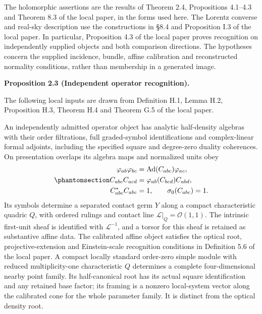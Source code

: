 \documentclass[
  english,
  11pt,
  reqno]{amsart}
\makeatletter
\newcommand{\pandocstatementheading}[1]{%
  \par\addpenalty{\@beginparpenalty}%
  \addvspace{.5\baselineskip plus .2\baselineskip minus .2\baselineskip}%
  {\normalfont\bfseries #1\par}%
  \nobreak\@afterindenttrue\@afterheading
}
\makeatother
\begin{document}
The holomorphic assertions are the results of Theorem 2.4, Propositions
4.1--4.3 and Theorem 8.3 of the local paper, in the forms used here. The
Lorentz converse and real-sky description use the constructions in §8.4
and Proposition I.3 of the local paper. In particular, Proposition 4.3
of the local paper proves recognition on independently supplied objects
and both comparison directions. The hypotheses concern the supplied
incidence, bundle, affine calibration and reconstructed normality
conditions, rather than membership in a generated image.

\pandocstatementheading{\protect{}\label{prop:independent-local-operator-input}Proposition 2.3 (Independent operator recognition).}

The following local inputs are drawn from Definition H.1, Lemma H.2,
Proposition H.3, Theorem H.4 and Theorem G.5 of the local paper.

An independently admitted operator object has analytic half-density
algebras with their order filtrations, full graded-symbol
identifications and complex-linear formal adjoints, including the
specified square and degree-zero duality coherences. On presentation
overlaps its algebra maps and normalized units obey
\begin{equation}\protect\phantomsection\label{eq:local-operator-algebroid-input}{
\begin{aligned}
\varphi_{ab}\varphi_{bc}
&=\operatorname{Ad}(C_{abc})\varphi_{ac},\\
C_{abc}C_{acd}
&=\varphi_{ab}(C_{bcd})C_{abd},\\
C_{abc}^*C_{abc}&=1,
\qquad \sigma_0(C_{abc})=1.
\end{aligned}
}\end{equation} Its symbols determine a separated contact germ \(Y\)
along a compact characteristic quadric \(Q\), with ordered rulings and
contact line \(\mathcal L|_Q=\mathcal O(1,1)\). The intrinsic first-unit
sheaf is identified with \(\mathcal L^{-1}\), and a torsor for this
sheaf is retained as substantive affine data. The calibrated affine
object satisfies the optical root, projective-extension and
Einstein-scale recognition conditions in Definition 5.6 of the local
paper. A compact locally standard order-zero simple module with reduced
multiplicity-one characteristic \(Q\) determines a complete
four-dimensional nearby point family. Its half-canonical root has its
actual square identification and any retained base factor; its framing
is a nonzero local-system vector along the calibrated cone for the whole
parameter family. It is distinct from the optical density root.
\end{document}
